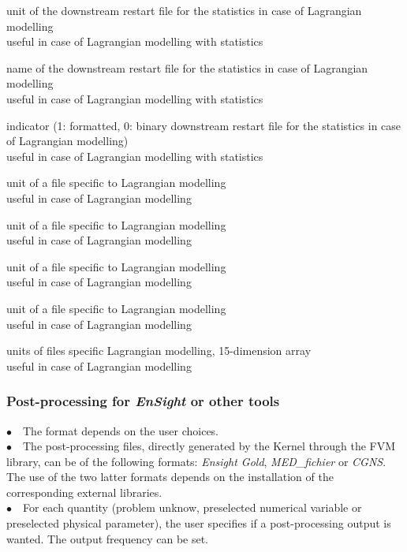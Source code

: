 {unit of the downstream restart file for the statistics in case of
Lagrangian modelling\\
useful in case of Lagrangian modelling with statistics}

{name of the downstream restart file for the statistics in case of
Lagrangian modelling\\
useful in case of Lagrangian modelling with statistics}

{indicator (1: formatted, 0: binary downstream restart file for the
statistics in case of Lagrangian modelling)\\ 
useful in case of Lagrangian modelling with statistics}

{unit of a file specific to Lagrangian modelling\\
useful in case of Lagrangian modelling}

{unit of a file specific to Lagrangian modelling\\ 
useful in case of Lagrangian modelling}

{unit of a file specific to Lagrangian modelling\\
useful in case of Lagrangian modelling}

{unit of a file specific to Lagrangian modelling\\
useful in case of Lagrangian modelling}

{units of files specific Lagrangian modelling, 15-dimension array\\
useful in case of Lagrangian modelling}


\subsubsection{Post-processing for {\em EnSight} or other tools}

$\bullet\quad$The format depends on the user choices.\\ 
$\bullet\quad$The post-processing files, directly generated by the Kernel
through the FVM library, can be of the following formats: {\em Ensight Gold},
{\em MED\_fichier} or {\em CGNS}. The use of the two latter formats depends on
the installation of the corresponding external libraries.\\
$\bullet\quad$For each quantity (problem unknow, preselected numerical
variable or preselected physical parameter), the user specifies if a
post-processing output is wanted. The output frequency can be set.\\


